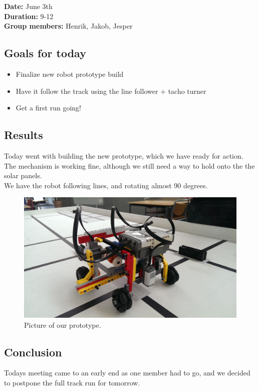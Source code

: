 \textbf{Date:} June 3th\\\textbf{Duration:} 9-12\\\textbf{Group
members:} Henrik, Jakob, Jesper

\subsection{Goals for today}

\begin{itemize}
\itemsep1pt\parskip0pt
\item
  Finalize new robot prototype build
\item
  Have it follow the track using the line follower + tacho turner
\item
  Get a first run going!
\end{itemize}

\subsection{Results}

Today went with building the new prototype, which we have ready for
action. The mechanism is working fine, although we still need a way to
hold onto the the solar panels.\\We have the robot following lines, and
rotating almost 90 degrees.
\begin{figure}[hbt]
  \centering
  \includegraphics[scale=0.1]{../experiments/images/simplePrototype.jpg}
\caption{Picture of our prototype.}
\end{figure}
\subsection{Conclusion}

Todays meeting came to an early end as one member had to go, and we
decided to postpone the full track run for tomorrow.
